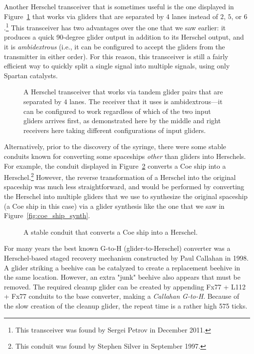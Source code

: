 Another Herschel transceiver that is sometimes useful is the one displayed in Figure~\ref{fig:herschel_transceiver_4} that works via gliders that are separated by $4$ lanes instead of $2$, $5$, or $6$.\footnote{This transceiver was found by Sergei Petrov in December 2011.} This transceiver has two advantages over the one that we saw earlier: it produces a quick 90-degree glider output in addition to its Herschel output, and it is \emph{ambidextrous} (i.e., it can be configured to accept the gliders from the transmitter in either order). For this reason, this transceiver is still a fairly efficient way to quickly split a single signal into multiple signals, using only Spartan catalysts.

\begin{figure}[!htb]
	\centering
	\caption{A Herschel transceiver that works via tandem glider pairs that are separated by $4$ lanes. The receiver that it uses is ambidextrous---it can be configured to work regardless of which of the two input gliders arrives first, as demonstrated here by the middle and right receivers here taking different configurations of input gliders.}
	\label{fig:herschel_transceiver_4}
\end{figure}

Alternatively, prior to the discovery of the syringe, there were some stable conduits known for converting some spaceships \emph{other} than gliders into Herschels. For example, the conduit displayed in Figure~\ref{fig:coe_to_herschel} converts a Coe ship into a Herschel.\footnote{This conduit was found by Stephen Silver in September 1997.} However, the reverse transformation of a Herschel into the original spaceship was much less straightforward, and would be performed by converting the Herschel into multiple gliders that we use to synthesize the original spaceship (a Coe ship in this case) via a glider synthesis like the one that we saw in Figure~\ref{fig:coe_ship_synth}.

\begin{figure}[!htb]
	\centering{}
	\caption{A stable conduit that converts a Coe ship into a Herschel.}\label{fig:coe_to_herschel}
\end{figure}

For many years the best known G-to-H (glider-to-Herschel) converter was a Herschel-based staged recovery mechanism constructed by Paul Callahan in 1998. A glider striking a beehive can be catalyzed to create a replacement beehive in the same location.  However, an extra "junk" beehive also appears that must be removed.  The required cleanup glider can be created by appending Fx77 + L112 + Fx77 conduits to the base converter, making a \emph{Callahan G-to-H}.  Because of the slow creation of the cleanup glider, the repeat time is a rather high 575 ticks.

